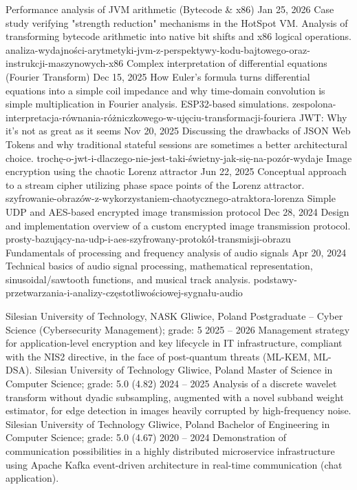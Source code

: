 
\newcommand{\BlogTitle}{Technical blog}
\newcommand{\BlogNote}{(Article in Polish)}
\renewcommand{\BlogList}{}
\AddBlogEntry
  {Performance analysis of JVM arithmetic (Bytecode \& x86)}
  {Jan 25, 2026}
  {%
    Case study verifying "strength reduction" mechanisms in the HotSpot VM. Analysis of transforming bytecode arithmetic
    into native bit shifts and x86 logical operations.
  }
  {analiza-wydajności-arytmetyki-jvm-z-perspektywy-kodu-bajtowego-oraz-instrukcji-maszynowych-x86}
\AddBlogEntry
  {Complex interpretation of differential equations (Fourier Transform)}
  {Dec 15, 2025}
  {%
    How Euler's formula turns differential equations into a simple coil impedance and why time-domain convolution is
    simple multiplication in Fourier analysis. ESP32-based simulations.
  }
  {zespolona-interpretacja-równania-różniczkowego-w-ujęciu-transformacji-fouriera}
\AddBlogEntry
  {JWT: Why it's not as great as it seems}
  {Nov 20, 2025}
  {%
    Discussing the drawbacks of JSON Web Tokens and why traditional stateful sessions are sometimes a better
    architectural choice.
  }
  {trochę-o-jwt-i-dlaczego-nie-jest-taki-świetny-jak-się-na-pozór-wydaje}
\AddBlogEntry
  {Image encryption using the chaotic Lorenz attractor}
  {Jun 22, 2025}
  {Conceptual approach to a stream cipher utilizing phase space points of the Lorenz attractor.}
  {szyfrowanie-obrazów-z-wykorzystaniem-chaotycznego-atraktora-lorenza}
\AddBlogEntry
  {Simple UDP and AES-based encrypted image transmission protocol}
  {Dec 28, 2024}
  {Design and implementation overview of a custom encrypted image transmission protocol.}
  {prosty-bazujący-na-udp-i-aes-szyfrowany-protokół-transmisji-obrazu}
\AddBlogEntry
  {Fundamentals of processing and frequency analysis of audio signals}
  {Apr 20, 2024}
  {%
    Technical basics of audio signal processing, mathematical representation, sinusoidal/sawtooth functions, and musical
    track analysis.
  }
  {podstawy-przetwarzania-i-analizy-częstotliwościowej-sygnału-audio}


\newcommand{\EducationTitle}{Education}
\newcommand{\ThesisLabel}{Thesis}
\renewcommand{\EducationList}{}
\AddEducationEntry
  {Silesian University of Technology, NASK}
  {Gliwice, Poland}
  {Postgraduate -- Cyber Science (Cybersecurity Management); grade: 5}
  {2025 -- 2026}
  {%
    Management strategy for application-level encryption and key lifecycle in IT infrastructure, compliant with the NIS2
    directive, in the face of post-quantum threats (ML-KEM, ML-DSA).
  }
\AddEducationEntry
  {Silesian University of Technology}
  {Gliwice, Poland}
  {Master of Science in Computer Science; grade: 5.0 (4.82)}
  {2024 -- 2025}
  {%
    Analysis of a discrete wavelet transform without dyadic subsampling, augmented with a novel subband weight
    estimator, for edge detection in images heavily corrupted by high-frequency noise.
  }
\AddEducationEntry
  {Silesian University of Technology}
  {Gliwice, Poland}
  {Bachelor of Engineering in Computer Science; grade: 5.0 (4.67)}
  {2020 -- 2024}
  {%
    Demonstration of communication possibilities in a highly distributed microservice infrastructure using Apache Kafka
    event-driven architecture in real-time communication (chat application).
  }

